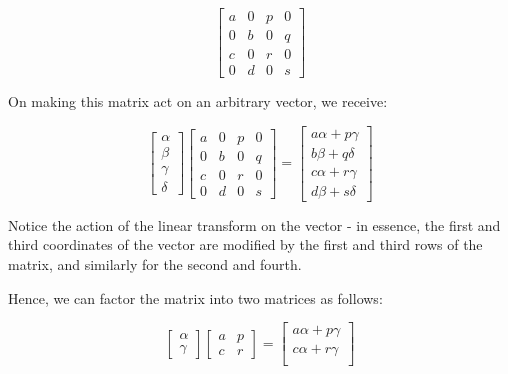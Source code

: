 \documentclass[11pt]{article}
\begin{document}
\[
    \left [
        \begin{array}{cc|cc}
            a & 0 & p & 0\\
            0 & b & 0 & q \\
            \hline
            c & 0 & r & 0 \\
            0 & d & 0 & s
        \end{array}
    \right ]
\]

On making this matrix act on an arbitrary vector, we receive:


\[
    \begin{bmatrix} \alpha \\ \beta \\ \gamma \\ \delta \end{bmatrix}
    \left [
        \begin{array}{cc|cc}
            a & 0 & p & 0\\
            0 & b & 0 & q \\
            \hline
            c & 0 & r & 0 \\
            0 & d & 0 & s
        \end{array}
    \right ]
    =
    \begin{bmatrix}
        a \alpha + p \gamma \\
        b \beta + q \delta \\
        c \alpha + r \gamma \\
        d \beta + s \delta
    \end{bmatrix}
\]

Notice the action of the linear transform on the vector - in essence,
the first and third coordinates of the vector are modified by the
first and third rows of the matrix, and similarly for the second and
fourth.

Hence, we can factor the matrix into two matrices as follows:

\[
    \begin{bmatrix} \alpha \\ \gamma \end{bmatrix}
    \left [
        \begin{array}{cc}
            a & p \\
            c & r
        \end{array}
    \right ]
    =
    \begin{bmatrix}
        a \alpha + p \gamma \\
        c \alpha + r \gamma \\
    \end{bmatrix}
\]
\end{document}
